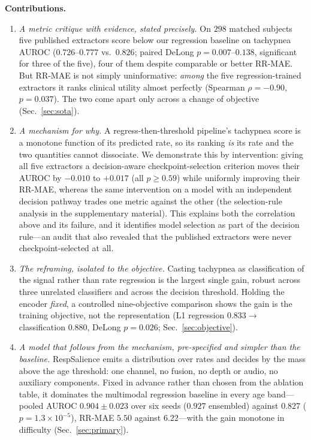 \documentclass[journal]{IEEEtran}
\begin{document}
\noindent\textbf{Contributions.}
\begin{enumerate}
\item \emph{A metric critique with evidence, stated precisely.} On $298$ matched subjects five
published extractors score below our regression baseline on tachypnea AUROC ($0.726$--$0.777$ vs.\
$0.826$; paired DeLong $p=0.007$--$0.138$, significant for three of the five), four of them despite
comparable or better RR-MAE. But RR-MAE is not simply uninformative: \emph{among} the five
regression-trained extractors it ranks clinical utility almost perfectly (Spearman $\rho=-0.90$,
$p=0.037$). The two come apart only across a change of objective (Sec.~\ref{sec:sota}).

\item \emph{A mechanism for why.} A regress-then-threshold pipeline's tachypnea score is a monotone
function of its predicted rate, so its ranking \emph{is} its rate and the two quantities cannot
dissociate. We demonstrate this by intervention: giving all five extractors a decision-aware
checkpoint-selection criterion moves their AUROC by ${-}0.010$ to ${+}0.017$ (all $p\ge0.59$) while
uniformly improving their RR-MAE, whereas the same intervention on a model with an independent decision
pathway trades one metric against the other (the selection-rule analysis in the supplementary
material). This explains both the
correlation above and its failure, and it identifies model selection as part of the decision rule---an
audit that also revealed that the published extractors were never checkpoint-selected at all.

\item \emph{The reframing, isolated to the objective.} Casting tachypnea as classification of the
signal rather than rate regression is the largest single gain, robust across three unrelated
classifiers and across the decision threshold. Holding the encoder \emph{fixed}, a controlled
nine-objective comparison shows the gain is the training objective, not the representation
(L1 regression $0.833 \to$ classification $0.880$, DeLong $p=0.026$; Sec.~\ref{sec:objective}).

\item \emph{A model that follows from the mechanism, pre-specified and simpler than the baseline.}
RespSalience emits a distribution over rates and decides by the mass above the age threshold: one
channel, no fusion, no depth or audio, no auxiliary components. Fixed in advance rather than chosen
from the ablation table, it dominates the multimodal regression baseline in every age band---pooled
AUROC $0.904\pm0.023$ over six seeds ($0.927$ ensembled) against $0.827$
($p=1.3{\times}10^{-5}$), RR-MAE $5.50$ against $6.22$---with the gain monotone in difficulty
(Sec.~\ref{sec:primary}).


\end{enumerate}
\end{document}
